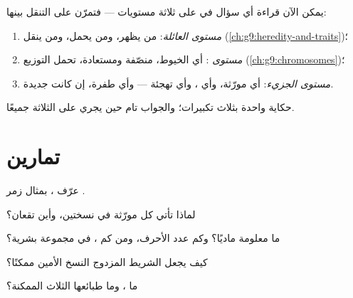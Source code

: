 \begin{method}\label{met:g9:genes-and-dna:levels}
يمكن الآن قراءة أي سؤال في  على ثلاثة مستويات ---
فتمرّن على التنقل بينها:
\begin{enumerate}
  \item \emph{مستوى العائلة}: من يظهر، ومن يحمل، ومن
        ينقل (\cref{ch:g9:heredity-and-traits})؛
  \item \emph{مستوى }: أي الخيوط، منصّفة
        ومستعادة، تحمل التوزيع
        (\cref{ch:g9:chromosomes})؛
  \item \emph{مستوى الجزيء}: أي مورّثة، وأي ، وأي
        تهجئة --- وأي طفرة، إن كانت  جديدة.
\end{enumerate}
حكاية واحدة بثلاث تكبيرات؛ والجواب تام حين يجري على
الثلاثة جميعًا.
\end{method}

\section{تمارين}

\begin{exercise}[$\star$]\label{exo:g9:genes-and-dna:1}
عرّف  ، بمثال زمر .
\end{exercise}

\begin{exercise}[$\star$]\label{exo:g9:genes-and-dna:2}
لماذا تأتي كل مورّثة في نسختين، وأين تقعان؟
\end{exercise}

\begin{exercise}[$\star$]\label{exo:g9:genes-and-dna:3}
ما معلومة  ماديًا؟ وكم عدد الأحرف، ومن كم ، في
مجموعة بشرية؟
\end{exercise}

\begin{exercise}[$\star$]\label{exo:g9:genes-and-dna:4}
كيف يجعل الشريط المزدوج النسخ الأمين ممكنًا؟
\end{exercise}

\begin{exercise}[$\star$]\label{exo:g9:genes-and-dna:5}
ما ، وما طبائعها الثلاث الممكنة؟
\end{exercise}

